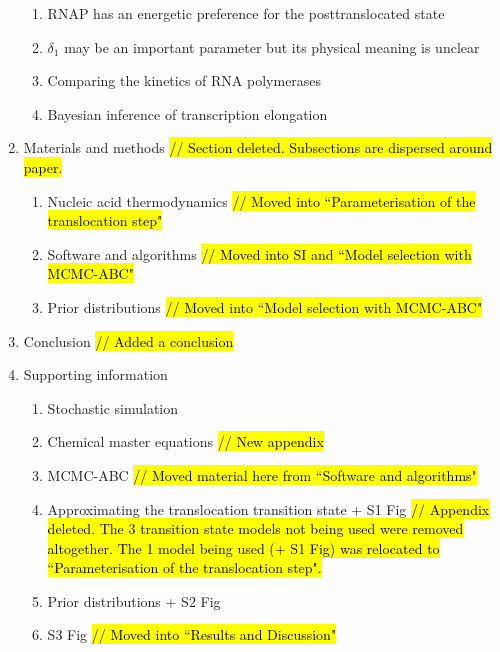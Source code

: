 \documentclass[12pt]{article}
\begin{document}
\begin{enumerate}
\begin{enumerate}
		\item RNAP has an energetic preference for the posttranslocated
state

		\item $\delta_1$ may be an important parameter but its physical meaning is
unclear

		\item Comparing the kinetics of RNA polymerases

		\item Bayesian inference of transcription elongation


	\end{enumerate}
	
	
	\item Materials and methods  \hl{ // Section deleted. Subsections are dispersed around paper. } 
	\begin{enumerate}

		\item Nucleic acid thermodynamics \hl{// Moved into ``Parameterisation of the translocation step"}
		
		
		\item Software and algorithms \hl{// Moved into SI and ``Model selection with MCMC-ABC"}
		
		\item Prior distributions \hl{// Moved into ``Model selection with MCMC-ABC"}



	\end{enumerate}
	
	
	\item Conclusion  \hl{ // Added a conclusion}
	
	
	\item Supporting information
	\begin{enumerate}

		\item Stochastic simulation
		
		\item Chemical master equations  \hl{// New appendix}
		
		\item MCMC-ABC \hl{// Moved material here from ``Software and algorithms"}
		
		\item Approximating the translocation transition state  + S1 Fig \hl{// Appendix deleted. The 3 transition state models not being used were removed altogether. The 1 model being used (+ S1 Fig) was relocated to ``Parameterisation of the translocation step".}
		
		
		\item Prior distributions + S2 Fig
		
		
		\item S3 Fig \hl{// Moved into ``Results and Discussion"}



	\end{enumerate}



\end{enumerate}
\end{document}
